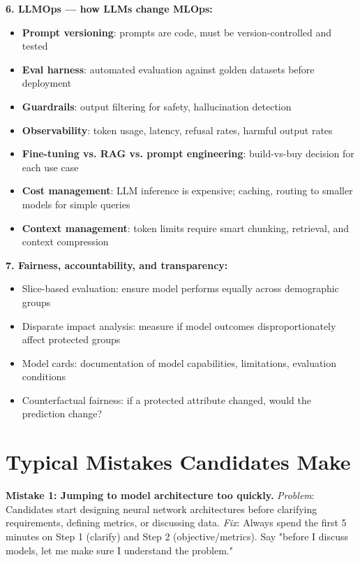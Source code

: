 \documentclass[11pt]{article}
\providecommand{\tightlist}{\setlength{\itemsep}{1pt}\setlength{\parskip}{0pt}}
\begin{document}
\textbf{6. LLMOps --- how LLMs change MLOps:}

\begin{itemize}
\tightlist
\item
  \textbf{Prompt versioning}: prompts are code, must be version-controlled and tested
\item
  \textbf{Eval harness}: automated evaluation against golden datasets before deployment
\item
  \textbf{Guardrails}: output filtering for safety, hallucination detection
\item
  \textbf{Observability}: token usage, latency, refusal rates, harmful output rates
\item
  \textbf{Fine-tuning vs. RAG vs. prompt engineering}: build-vs-buy decision for each use case
\item
  \textbf{Cost management}: LLM inference is expensive; caching, routing to smaller models for simple queries
\item
  \textbf{Context management}: token limits require smart chunking, retrieval, and context compression
\end{itemize}

\textbf{7. Fairness, accountability, and transparency:}

\begin{itemize}
\tightlist
\item
  Slice-based evaluation: ensure model performs equally across demographic groups
\item
  Disparate impact analysis: measure if model outcomes disproportionately affect protected groups
\item
  Model cards: documentation of model capabilities, limitations, evaluation conditions
\item
  Counterfactual fairness: if a protected attribute changed, would the prediction change?
\end{itemize}

\section{Typical Mistakes Candidates Make}\label{typical-mistakes-candidates-make}

\textbf{Mistake 1: Jumping to model architecture too quickly.}
\emph{Problem}: Candidates start designing neural network architectures before clarifying requirements, defining metrics, or discussing data.
\emph{Fix}: Always spend the first 5 minutes on Step 1 (clarify) and Step 2 (objective/metrics). Say "before I discuss models, let me make sure I understand the problem."
\end{document}
